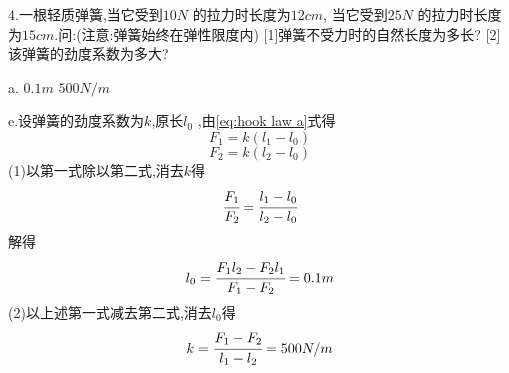  \begin{calculate}
   4.一根轻质弹簧,当它受到$10N$ 的拉力时长度为$12cm$, 当它受到$25N$ 的拉力时长度为$15cm$.问:(注意:弹簧始终在弹性限度内)
   [1]弹簧不受力时的自然长度为多长?
   [2]该弹簧的劲度系数为多大?

   a. $0.1m $ \qquad $500N/m$

   e.设弹簧的劲度系数为$k$,原长$l_0$ ,由\eqref{eq:hook law a}式得
   $$F_1=k(l_1-l_0)$$
   $$F_2=k(l_2-l_0)$$
   (1)以第一式除以第二式,消去$k$得
   $$\cfrac{F_1}{F_2}=\cfrac{l_1-l_0}{l_2-l_0}$$
   解得
   $$l_0=\cfrac{F_1l_2-F_2l_1}{F_1-F_2}=0.1m$$
   (2)以上述第一式减去第二式,消去$l_0$得
   $$k=\cfrac{F_1-F_2}{l_1-l_2}=500N/m$$



 \end{calculate}
